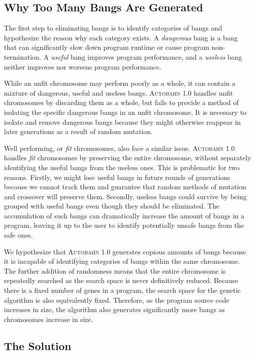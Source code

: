 \documentclass[format=sigplan, review=true]{acmart}
\newcommand{\unfit}[0]{unfit}
\newcommand{\dangerous}[0]{dangerous}
\newcommand{\useful}[0]{useful}
\newcommand{\useless}[0]{useless}
\newcommand{\Ao}[0]{\textsc{Autobahn 1.0}}
\newcommand{\fit}[0]{\textit{fit}}
\begin{document}
\subsection{Why Too Many Bangs Are Generated}

The first step to eliminating bangs is to identify categories of bangs and hypothesize the reason why each category exists. A \textit{\dangerous{}} bang is a bang that can significantly slow down program runtime or cause program non-termination. A \textit{\useful{}} bang improves program performance, and a \textit{\useless{}} bang neither improves nor worsens program performance. 

While an \unfit{} chromosome may perform poorly as a whole, it can contain a mixture of \dangerous, \useful{} and \useless{} bangs. \Ao{} handles \unfit{} chromosomes by discarding them as a whole, but fails to provide a method of isolating the specific \dangerous{} bangs in an \unfit{} chromosome. It is necessary to isolate and remove \dangerous{} bangs because they might otherwise reappear in later generations as a result of random mutation. 

Well performing, or \fit{} chromosomes, also face a similar issue. \Ao{} handles \fit{} chromosomes by preserving the entire chromosome, without separately identifying the \useful{} bangs from the \useless{} ones. This is problematic for two reasons. Firstly, we might lose \useful{} bangs in future rounds of generations because we cannot track them and guarantee that random methods of mutation and crossover will preserve them. Secondly, \useless{} bangs could survive by being grouped with \useful{} bangs even though they should be eliminated. The accumulation of such bangs can dramatically increase the amount of bangs in a program, leaving it up to the user to identify potentially unsafe bangs from the safe ones. 

We hypothesize that \Ao{} generates copious amounts of bangs because it is incapable of identifying categories of bangs within the same chromosome. The further addition of randomness means that the entire chromosome is repeatedly searched as the search space is never definitively reduced. Because there is a fixed number of genes in a program, the search space for the genetic algorithm is also equivalently fixed. Therefore, as the program source code increases in size, the algorithm also generates significantly more bangs as chromosomes increase in size. 

\subsection{The Solution}
\end{document}
